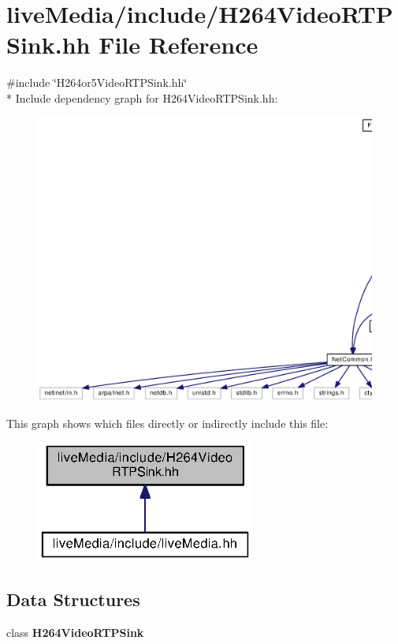 \section{live\+Media/include/\+H264\+Video\+R\+T\+P\+Sink.hh File Reference}
\label{H264VideoRTPSink_8hh}
{\ttfamily \#include \char`\"{}H264or5\+Video\+R\+T\+P\+Sink.\+hh\char`\"{}}\\*
Include dependency graph for H264\+Video\+R\+T\+P\+Sink.\+hh\+:
\nopagebreak
\begin{figure}[H]
\begin{center}
\leavevmode
\includegraphics[width=350pt]{H264VideoRTPSink_8hh__incl}
\end{center}
\end{figure}
This graph shows which files directly or indirectly include this file\+:
\nopagebreak
\begin{figure}[H]
\begin{center}
\leavevmode
\includegraphics[width=204pt]{H264VideoRTPSink_8hh__dep__incl}
\end{center}
\end{figure}
\subsection*{Data Structures}
\begin{DoxyCompactItemize}
\item 
class {\bf H264\+Video\+R\+T\+P\+Sink}
\end{DoxyCompactItemize}
